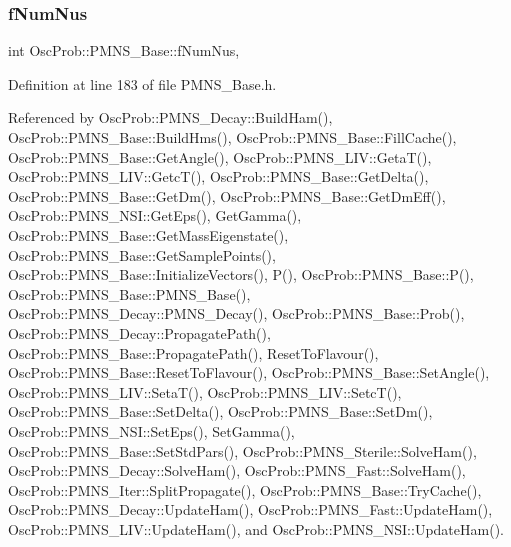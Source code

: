 \subsubsection{\texorpdfstring{f\+Num\+Nus}{fNumNus}}
{\footnotesize\ttfamily int Osc\+Prob\+::\+P\+M\+N\+S\+\_\+\+Base\+::f\+Num\+Nus\hspace{0.3cm}{\ttfamily [protected]}, {\ttfamily [inherited]}}



Definition at line 183 of file P\+M\+N\+S\+\_\+\+Base.\+h.



Referenced by Osc\+Prob\+::\+P\+M\+N\+S\+\_\+\+Decay\+::\+Build\+Ham(), Osc\+Prob\+::\+P\+M\+N\+S\+\_\+\+Base\+::\+Build\+Hms(), Osc\+Prob\+::\+P\+M\+N\+S\+\_\+\+Base\+::\+Fill\+Cache(), Osc\+Prob\+::\+P\+M\+N\+S\+\_\+\+Base\+::\+Get\+Angle(), Osc\+Prob\+::\+P\+M\+N\+S\+\_\+\+L\+I\+V\+::\+Geta\+T(), Osc\+Prob\+::\+P\+M\+N\+S\+\_\+\+L\+I\+V\+::\+Getc\+T(), Osc\+Prob\+::\+P\+M\+N\+S\+\_\+\+Base\+::\+Get\+Delta(), Osc\+Prob\+::\+P\+M\+N\+S\+\_\+\+Base\+::\+Get\+Dm(), Osc\+Prob\+::\+P\+M\+N\+S\+\_\+\+Base\+::\+Get\+Dm\+Eff(), Osc\+Prob\+::\+P\+M\+N\+S\+\_\+\+N\+S\+I\+::\+Get\+Eps(), Get\+Gamma(), Osc\+Prob\+::\+P\+M\+N\+S\+\_\+\+Base\+::\+Get\+Mass\+Eigenstate(), Osc\+Prob\+::\+P\+M\+N\+S\+\_\+\+Base\+::\+Get\+Sample\+Points(), Osc\+Prob\+::\+P\+M\+N\+S\+\_\+\+Base\+::\+Initialize\+Vectors(), P(), Osc\+Prob\+::\+P\+M\+N\+S\+\_\+\+Base\+::\+P(), Osc\+Prob\+::\+P\+M\+N\+S\+\_\+\+Base\+::\+P\+M\+N\+S\+\_\+\+Base(), Osc\+Prob\+::\+P\+M\+N\+S\+\_\+\+Decay\+::\+P\+M\+N\+S\+\_\+\+Decay(), Osc\+Prob\+::\+P\+M\+N\+S\+\_\+\+Base\+::\+Prob(), Osc\+Prob\+::\+P\+M\+N\+S\+\_\+\+Decay\+::\+Propagate\+Path(), Osc\+Prob\+::\+P\+M\+N\+S\+\_\+\+Base\+::\+Propagate\+Path(), Reset\+To\+Flavour(), Osc\+Prob\+::\+P\+M\+N\+S\+\_\+\+Base\+::\+Reset\+To\+Flavour(), Osc\+Prob\+::\+P\+M\+N\+S\+\_\+\+Base\+::\+Set\+Angle(), Osc\+Prob\+::\+P\+M\+N\+S\+\_\+\+L\+I\+V\+::\+Seta\+T(), Osc\+Prob\+::\+P\+M\+N\+S\+\_\+\+L\+I\+V\+::\+Setc\+T(), Osc\+Prob\+::\+P\+M\+N\+S\+\_\+\+Base\+::\+Set\+Delta(), Osc\+Prob\+::\+P\+M\+N\+S\+\_\+\+Base\+::\+Set\+Dm(), Osc\+Prob\+::\+P\+M\+N\+S\+\_\+\+N\+S\+I\+::\+Set\+Eps(), Set\+Gamma(), Osc\+Prob\+::\+P\+M\+N\+S\+\_\+\+Base\+::\+Set\+Std\+Pars(), Osc\+Prob\+::\+P\+M\+N\+S\+\_\+\+Sterile\+::\+Solve\+Ham(), Osc\+Prob\+::\+P\+M\+N\+S\+\_\+\+Decay\+::\+Solve\+Ham(), Osc\+Prob\+::\+P\+M\+N\+S\+\_\+\+Fast\+::\+Solve\+Ham(), Osc\+Prob\+::\+P\+M\+N\+S\+\_\+\+Iter\+::\+Split\+Propagate(), Osc\+Prob\+::\+P\+M\+N\+S\+\_\+\+Base\+::\+Try\+Cache(), Osc\+Prob\+::\+P\+M\+N\+S\+\_\+\+Decay\+::\+Update\+Ham(), Osc\+Prob\+::\+P\+M\+N\+S\+\_\+\+Fast\+::\+Update\+Ham(), Osc\+Prob\+::\+P\+M\+N\+S\+\_\+\+L\+I\+V\+::\+Update\+Ham(), and Osc\+Prob\+::\+P\+M\+N\+S\+\_\+\+N\+S\+I\+::\+Update\+Ham().

